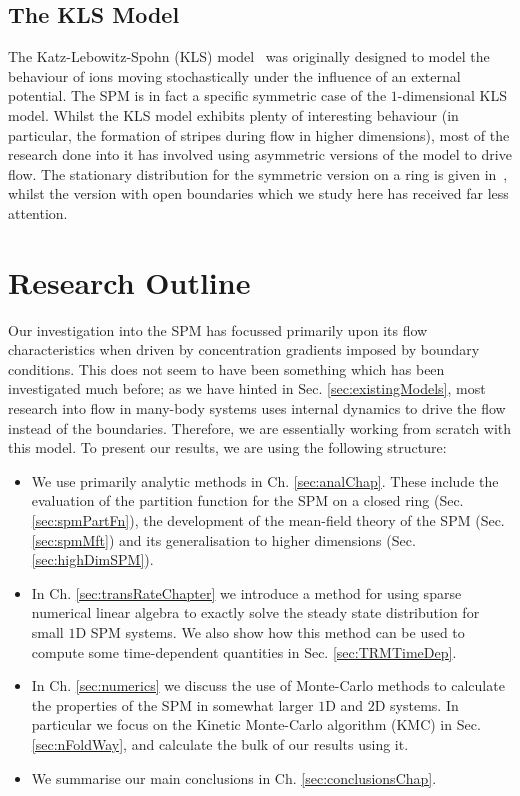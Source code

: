 \subsection{The KLS Model}
The Katz-Lebowitz-Spohn (KLS) model~\cite{Katz1984, Zia2010} was originally designed to model the
behaviour of ions moving stochastically
under the influence of an external potential. The SPM is in fact a specific symmetric case of the
$1$-dimensional KLS model. Whilst the KLS model exhibits plenty of interesting behaviour
(in particular, the formation of stripes during flow in higher dimensions), most of the research done
into it has involved using asymmetric versions of the model to drive flow. The stationary
distribution for the symmetric version on a ring is given in~\cite{Katz1984}, whilst the version with open boundaries
which we study here has received far less attention.

\section{Research Outline}
Our investigation into the SPM has focussed primarily upon its flow characteristics when driven
by concentration gradients imposed by boundary conditions. This does not seem to have been something
which has been investigated much before; as we have hinted in Sec. \ref{sec:existingModels}, most
research into flow in many-body systems uses internal dynamics to drive the flow instead of the 
boundaries. Therefore, we are essentially working from scratch with this model.
To present our results, we are using the following structure:
\begin{itemize}
 \item We use primarily analytic methods in Ch. \ref{sec:analChap}. These include the evaluation
 of the partition function for the SPM on a closed ring (Sec. \ref{sec:spmPartFn}), the development
 of the mean-field theory of the SPM (Sec. \ref{sec:spmMft}) and its generalisation to higher dimensions
 (Sec. \ref{sec:highDimSPM}).
 \item In Ch. \ref{sec:transRateChapter} we introduce a method for using sparse numerical linear
 algebra to exactly solve the steady state distribution for small $1$D SPM systems. We also show how this
 method can be used to compute some time-dependent quantities in Sec. \ref{sec:TRMTimeDep}.
 \item In Ch. \ref{sec:numerics} we discuss the use of Monte-Carlo methods to calculate the properties
 of the SPM in somewhat larger $1$D and $2$D systems. In particular we focus on the Kinetic
  Monte-Carlo algorithm (KMC) in Sec. \ref{sec:nFoldWay}, and calculate the bulk of our results
  using it.
\item We summarise our main conclusions in Ch. \ref{sec:conclusionsChap}.
\end{itemize}



